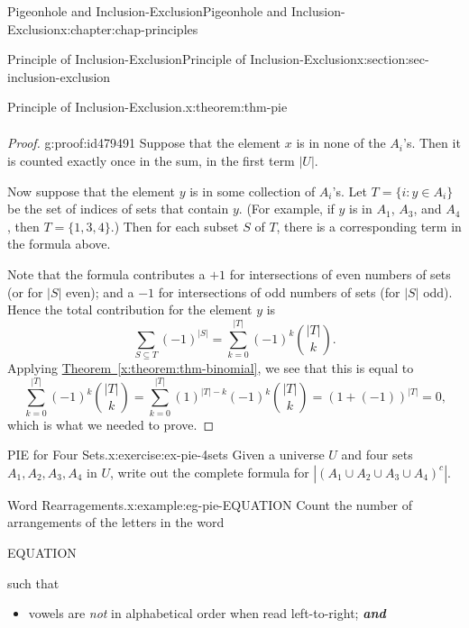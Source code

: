 \documentclass[oneside,10pt,]{book}
\newcommand{\xreffont}{\relax}
\newcommand{\alert}[1]{\textbf{\textit{#1}}}
\numberwithin{equation}{section}
\begin{document}
\begin{chapterptx}{Pigeonhole and Inclusion-Exclusion}{}{Pigeonhole and Inclusion-Exclusion}{}{}{x:chapter:chap-principles}
\begin{sectionptx}{Principle of Inclusion-Exclusion}{}{Principle of Inclusion-Exclusion}{}{}{x:section:sec-inclusion-exclusion}
\begin{theorem}{Principle of Inclusion-Exclusion.}{}{x:theorem:thm-pie}
\begin{align*}
\end{align*}
%
\end{theorem}
\begin{proof}{}{g:proof:id479491}
Suppose that the element \(x\) is in none of the \(A_i\)'s. Then it is counted exactly once in the sum, in the first term \(|U|\).%
\par
Now suppose that the element \(y\) is in some collection of \(A_i\)'s. Let \(T = \{i : y \in A_i\}\) be the set of indices of sets that contain \(y\). (For example, if \(y\) is in \(A_1\), \(A_3\), and \(A_4\), then \(T = \{1,3,4\}\).) Then for each subset \(S\) of \(T\), there is a corresponding term in the formula above.%
\par
Note that the formula contributes a \(+1\) for intersections of even numbers of sets (or for \(|S|\) even); and a \(-1\) for intersections of odd numbers of sets (for \(|S|\) odd). Hence the total contribution for the element \(y\) is%
\begin{equation*}
\sum_{S \subseteq T} (-1)^{|S|} = \sum_{k=0}^{|T|} (-1)^k\binom{|T|}{k}\text{.}
\end{equation*}
Applying \hyperref[x:theorem:thm-binomial]{Theorem~{\xreffont\ref{x:theorem:thm-binomial}}}, we see that this is equal to%
\begin{equation*}
\sum_{k=0}^{|T|} (-1)^k\binom{|T|}{k} = \sum_{k=0}^{|T|} (1)^{|T|-k}(-1)^k\binom{|T|}{k} = \left( 1 + (-1) \right)^{|T|} = 0\text{,}
\end{equation*}
which is what we needed to prove.%
\end{proof}
\begin{inlineexercise}{PIE for Four Sets.}{x:exercise:ex-pie-4sets}%
Given a universe \(U\) and four sets \(A_1, A_2, A_3, A_4\) in \(U\), write out the complete formula for \(|(A_1 \cup A_2 \cup A_3 \cup A_4)^c|\).%
\end{inlineexercise}
\begin{example}{Word Rearragements.}{x:example:eg-pie-EQUATION}%
Count the number of arrangements of the letters in the word%
\begin{sidebyside}{1}{0.425}{0.425}{0}%
\begin{sbspanel}{0.15}%
EQUATION%
\end{sbspanel}%
\end{sidebyside}%
\par
such that%
\begin{itemize}[label=\textbullet]
\item{}vowels are \emph{not} in alphabetical order when read left-to-right; \alert{and}%

\end{itemize}
\end{example}
\end{sectionptx}
\end{chapterptx}
\end{document}
